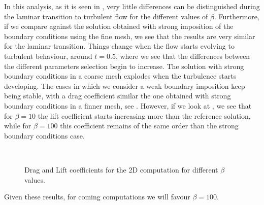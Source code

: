 In this analysis, as it is seen in , very little differences can be distinguished during the laminar transition to turbulent flow for the different values of $ \beta $. Furthermore, if we compare against the solution obtained with strong imposition of the boundary conditions using the fine mesh, we see that the results are very similar for the laminar transition. Things change when the flow starts evolving to turbulent behaviour, around $ t=0.5 $, where we see that the differences between the different parameters selection begin to increase. The solution with strong boundary conditions in a coarse mesh explodes when the turbulence starts developing. The cases in which we consider a weak boundary imposition keep being stable, with a drag coefficient similar the one obtained with strong boundary conditions in a finner mesh, see . However, if we look at , we see that for $ \beta=10 $ the lift coefficient starts increasing more than the reference solution, while for $ \beta=100 $ this coefficient remains of the same order than the strong boundary conditions case.
\begin{figure}[h!]
  \centering
  \\
  \caption{Drag and Lift coefficients for the 2D computation for different $ \beta $ values.}
  \label{fig-NACA_b_drag_lift}
\end{figure}
Given these results, for coming computations we will favour $ \beta=100 $.

